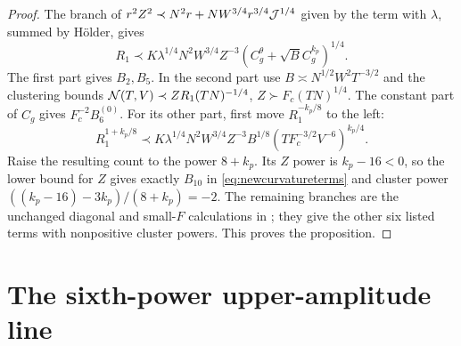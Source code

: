 \begin{proof}
The branch of
$r^2Z^2\prec N^2r+NW^{3/4}r^{3/4}\mathcal{J}^{1/4}$ given by the term with
$\lambda$, summed by H\"older, gives
\[
 R_1\prec K\lambda^{1/4}N^2W^{3/4}Z^{-3}
                 (C_g^\theta+\sqrt B C_g^{k_p})^{1/4}.
\]
The first part gives $B_2,B_5$. In the second part use
$B\asymp N^{1/2}W^2T^{-3/2}$ and the clustering bounds
$\mathcal{N}(T,V)\prec ZR_1(TN)^{-1/4}$, $Z\succ F_c(TN)^{1/4}$.
The constant part of $C_g$ gives $F_c^{-2}B_6^{(0)}$.
For its other part, first move $R_1^{-k_p/8}$ to the left:
\[
 R_1^{1+k_p/8}\prec K\lambda^{1/4}N^2W^{3/4}Z^{-3}B^{1/8}
                         (T F_c^{-3/2}V^{-6})^{k_p/4}.
\]
Raise the resulting count to the power $8+k_p$.
Its $Z$ power is $k_p-16<0$, so the lower bound for $Z$ gives
exactly $B_{10}$ in \eqref{eq:newcurvatureterms} and cluster power
$((k_p-16)-3k_p)/(8+k_p)=-2$.
The remaining branches are the unchanged diagonal and small-$F$
calculations in \cite[Section~\ref*{six-sec:return}]{Weighted}; they give the other six listed
terms with nonpositive cluster powers. This proves the proposition.
\end{proof}

\section{The sixth-power upper-amplitude line}
\label{app:upperthree}

